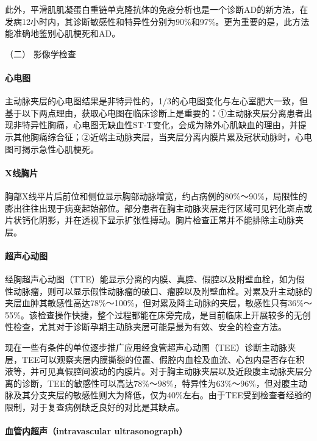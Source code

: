 此外，平滑肌肌凝蛋白重链单克隆抗体的免疫分析也是一个诊断AD的新方法，在发病12小时内，其诊断敏感性和特异性分别为90\%和97\%。更为重要的是，此方法能准确地鉴别心肌梗死和AD。

\hypertarget{text00314.htmlux5cux23CHP10-9-2-2-2}{}
（二） 影像学检查

\paragraph{心电图}

主动脉夹层的心电图结果是非特异性的，1/3的心电图变化与左心室肥大一致，但基于以下两点理由，获取心电图在临床诊断上是重要的：①主动脉夹层分离患者出现非特异性胸痛，心电图无缺血性ST-T变化，会成为除外心肌缺血的理由，并提示其他胸痛综合征；②近端主动脉夹层，当夹层分离内膜片累及冠状动脉时，心电图可揭示急性心肌梗死。

\paragraph{X线胸片}

胸部X线平片后前位和侧位显示胸部动脉增宽，约占病例的80\%～90\%，局限性的膨出往往出现于病变起始部位。部分患者在胸主动脉夹层走行区域可见钙化斑点或片状钙化阴影，并在透视下显示扩张性搏动。胸片检查正常并不能排除主动脉夹层。

\paragraph{超声心动图}

经胸超声心动图（TTE）能显示分离的内膜、真腔、假腔以及附壁血栓，如为假性动脉瘤，则可以显示假性动脉瘤的破口、瘤腔以及附壁血栓。对累及升主动脉的夹层血肿其敏感性高达78\%～100\%，但对累及降主动脉的夹层，敏感性只有36\%～55\%。该检查操作快捷，整个过程都能在床旁完成，是目前临床上开展较多的无创性检查，尤其对于诊断孕期主动脉夹层可能是最为有效、安全的检查方法。

现在一些有条件的单位逐步推广应用经食管超声心动图（TEE）诊断主动脉夹层，TEE可以观察夹层内膜撕裂的位置、假腔内血栓及血流、心包内是否存在积液等，并可见真假腔间波动的内膜片。对于胸主动脉夹层以及近段腹主动脉夹层分离的诊断，TEE的敏感性可以高达78\%～98\%，特异性为63\%～96\%，但对腹主动脉及其分支夹层的敏感性则大为降低，仅为40\%左右。由于TEE受到检查者经验的限制，对于复查病例缺乏良好的对比是其缺点。

\paragraph{血管内超声（intravascular ultrasonograph）}

